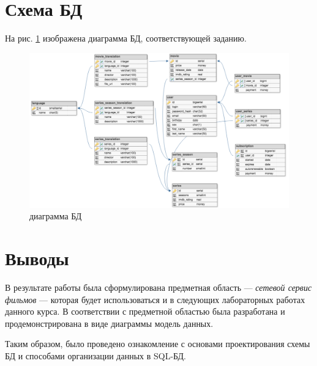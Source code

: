 \section{Схема БД}
 
На рис. \ref{fig:movie-service-diagram} изображена  диаграмма БД, соответствующей заданию.

\begin{figure}[H]
	\centering
	\includegraphics[width=1.0\textwidth]{diagrams/movie-service-diagram}
	\caption{ диаграмма БД}
	\label{fig:movie-service-diagram}
\end{figure}

\section{Выводы}

В результате работы была сформулирована предметная область --- \textit{сетевой сервис фильмов} --- которая будет использоваться и в следующих лабораторных работах данного курса. В соответствии с предметной областью
была разработана и продемонстрирована в виде  диаграммы модель данных.

Таким образом, было проведено ознакомление с основами проектирования схемы БД и способами организации данных в SQL-БД.


